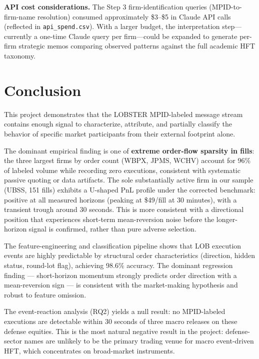 \documentclass[11pt, letterpaper]{article}
\begin{document}
\textbf{API cost considerations.}
The Step 3 firm-identification queries (MPID-to-firm-name resolution) consumed
approximately \$3--\$5 in Claude API calls (reflected in \texttt{api\_spend.csv}).
With a larger budget, the interpretation step---currently a one-time Claude
query per firm---could be expanded to generate per-firm strategic memos
comparing observed patterns against the full academic HFT taxonomy.

\section{Conclusion}

This project demonstrates that the LOBSTER MPID-labeled message stream contains
enough signal to characterize, attribute, and partially classify the behavior
of specific market participants from their external footprint alone.

The dominant empirical finding is one of \textbf{extreme order-flow sparsity
in fills}: the three largest firms by order count (WBPX, JPMS, WCHV) account
for 96\% of labeled volume while recording zero executions, consistent with
systematic passive quoting or data artifacts.
The sole substantially active firm in our sample (UBSS, 151 fills) exhibits
a U-shaped PnL profile under the corrected benchmark: positive at all measured
horizons (peaking at \$49/fill at 30 minutes), with a transient trough around
30 seconds.
This is more consistent with a directional position that experiences short-term
mean-reversion noise before the longer-horizon signal is confirmed, rather than
pure adverse selection.

The feature-engineering and classification pipeline shows that LOB execution
events are highly predictable by structural order characteristics (direction,
hidden status, round-lot flag), achieving 98.6\% accuracy.
The dominant regression finding --- short-horizon momentum strongly predicts
order direction with a mean-reversion sign --- is consistent with the
market-making hypothesis and robust to feature omission.

The event-reaction analysis (RQ2) yields a null result: no MPID-labeled
executions are detectable within 30 seconds of three macro releases on
these defense equities.
This is the most natural negative result in the project: defense-sector names
are unlikely to be the primary trading venue for macro event-driven HFT,
which concentrates on broad-market instruments.
\end{document}
